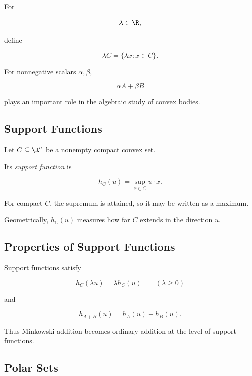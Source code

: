 For

\[
\lambda\in\R,
\]

define

\[
\boxed{
\lambda C
=
\{\lambda x:x\in C\}.
}
\]

For nonnegative scalars \(\alpha,\beta\),

\[
\alpha A+\beta B
\]

plays an important role in the algebraic study of convex bodies.

\subsection{Support Functions}
\label{subsec:support-functions}

Let \(C\subseteq\R^n\) be a nonempty compact convex set.

Its \emph{support function} is

\[
\boxed{
h_C(u)
=
\sup_{x\in C}u\cdot x.
}
\]

For compact \(C\), the supremum is attained, so it may be written as a
maximum.

Geometrically, \(h_C(u)\) measures how far \(C\) extends in the direction
\(u\).

\subsection{Properties of Support Functions}
\label{subsec:support-function-properties}

Support functions satisfy

\[
\boxed{
h_C(\lambda u)=\lambda h_C(u)
\qquad
(\lambda\geq0)
}
\]

and

\[
\boxed{
h_{A+B}(u)
=
h_A(u)+h_B(u).
}
\]

Thus Minkowski addition becomes ordinary addition at the level of support
functions.

\subsection{Polar Sets}
\label{subsec:polar-convex-sets}

